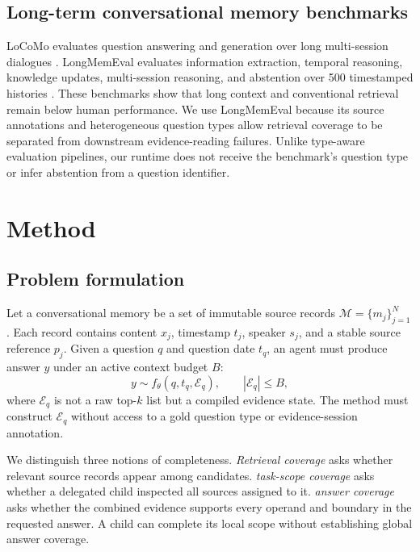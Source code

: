 \documentclass{article}
\begin{document}
\subsection{Long-term conversational memory benchmarks}

LoCoMo evaluates question answering and generation over long multi-session
dialogues \citep{maharana2024locomo}. LongMemEval evaluates information
extraction, temporal reasoning, knowledge updates, multi-session reasoning, and
abstention over 500 timestamped histories \citep{wu2025longmemeval}. These
benchmarks show that long context and conventional retrieval remain below human
performance. We use LongMemEval because its source annotations and heterogeneous
question types allow retrieval coverage to be separated from downstream
evidence-reading failures. Unlike type-aware evaluation pipelines, our runtime
does not receive the benchmark's question type or infer abstention from a
question identifier.

\section{Method}

\subsection{Problem formulation}

Let a conversational memory be a set of immutable source records
$\mathcal{M}=\{m_j\}_{j=1}^{N}$. Each record contains content $x_j$, timestamp
$t_j$, speaker $s_j$, and a stable source reference $p_j$. Given a question
$q$ and question date $t_q$, an agent must produce answer $y$ under an active
context budget $B$:
\begin{equation}
    y \sim f_\theta\!\left(q,t_q,\mathcal{E}_q\right),
    \qquad |\mathcal{E}_q| \leq B,
\end{equation}
where $\mathcal{E}_q$ is not a raw top-$k$ list but a compiled evidence state.
The method must construct $\mathcal{E}_q$ without access to a gold question
type or evidence-session annotation.

We distinguish three notions of completeness. \emph{Retrieval coverage} asks
whether relevant source records appear among candidates. \emph{task-scope
coverage} asks whether a delegated child inspected all sources assigned to it.
\emph{answer coverage} asks whether the combined evidence supports every operand
and boundary in the requested answer. A child can complete its local scope
without establishing global answer coverage.
\end{document}
